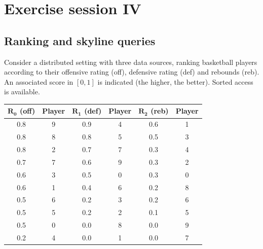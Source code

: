\documentclass[12pt, a4paper]{report}
\newtheorem[style=M,bodystyle=\normalfont]{theorem}{Theorem}
\newtheorem[style=M,bodystyle=\normalfont]{corollary}{Corollary}
\newtheorem[style=M,bodystyle=\normalfont]{lemma}{Lemma}
\newtheorem[style=M,bodystyle=\normalfont]{definition}{Definition}
\begin{document}
    \newpage 

    \chapter{Exercise session IV}
    \section{Ranking and skyline queries}
        Consider a distributed setting with three data sources, ranking basketball players according to their offensive rating (off), defensive rating (def) and rebounds (reb).
        An associated score in $[0,1]$ is indicated (the higher, the better). Sorted access is available.
        \begin{table}[H]
            \centering
            \begin{tabular}{|cc|cc|cc|}
            \hline
            $\boldsymbol{R_0}$ \textbf{(off)} & \textbf{Player} & $\boldsymbol{R_1}$ \textbf{(def)} & \textbf{Player} & $\boldsymbol{R_2}$ \textbf{(reb)} & \textbf{Player} \\ \hline
            0.8         & 9      & 0.9         & 4      & 0.6         & 1      \\
            0.8         & 8      & 0.8         & 5      & 0.5         & 3      \\
            0.8         & 2      & 0.7         & 7      & 0.3         & 4      \\
            0.7         & 7      & 0.6         & 9      & 0.3         & 2      \\
            0.6         & 3      & 0.5         & 0      & 0.3         & 0      \\
            0.6         & 1      & 0.4         & 6      & 0.2         & 8      \\
            0.5         & 6      & 0.2         & 3      & 0.2         & 6      \\
            0.5         & 5      & 0.2         & 2      & 0.1         & 5      \\
            0.5         & 0      & 0.0         & 8      & 0.0         & 9      \\
            0.2         & 4      & 0.0         & 1      & 0.0         & 7      \\ \hline
            \end{tabular}
        \end{table}
\end{document}
